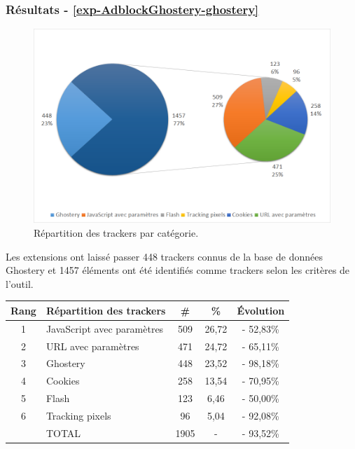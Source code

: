 \subsubsection{Résultats - \autoref{exp-AdblockGhostery-ghostery}}
\begin{figure}[!h]
	\centering
	\includegraphics[scale=.6]{resultats/ANALYSES/Images/AdblockGhostery-Ghostery.png}
	\caption{\label{exp-AdblockGhostery-ghostery}Répartition des trackers par catégorie.}
\end{figure}

Les extensions ont laissé passer 448 trackers connus de la base de données Ghostery et 1457 éléments ont été identifiés comme trackers selon les critères de l'outil.\\

\begin{tabular}{ c | p{5cm} | c | c || c | }
   Rang & Répartition des trackers & \# & \% & Évolution \\
   \hline
   \hline
   1 & JavaScript avec paramètres & 509 & 26,72 & - 52,83\% \\
   2 & URL avec paramètres & 471 & 24,72 & - 65,11\% \\
   3 & Ghostery & 448 & 23,52 & - 98,18\% \\
   4 & Cookies & 258 & 13,54 & - 70,95\% \\
   5 & Flash & 123 & 6,46 & - 50,00\% \\
   6 & Tracking pixels & 96 & 5,04 & - 92,08\% \\
   \hline
    & TOTAL & 1905 & - & - 93,52\%\\
   \hline
\end{tabular}
\\[1cm]

